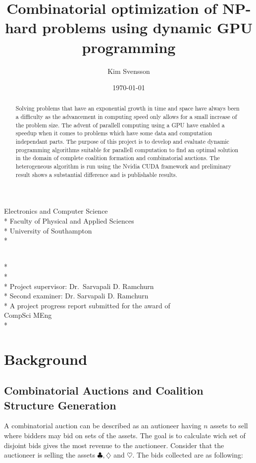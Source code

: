 \documentclass[a4paper, 12pt]{report}
\newcommand{\tdegree}{A project progress report submitted for the award of\\}
\newcommand{\degree}{\tdegree CompSci MEng\\*}
\newcommand{\texam}{Second examiner: }
\newcommand{\exam}{\texam Dr. Sarvapali D. Ramchurn}
\newcommand{\tsupervisor}{Project supervisor: }
\newcommand{\supervisor}{\tsupervisor Dr.\ Sarvapali D. Ramchurn}
\newcommand{\school}{Electronics and Computer Science \\*
Faculty of Physical and Applied Sciences\\*
University of Southampton\\*}
\newenvironment{changemargin}[2]{%
\begin{list}{}{%
\setlength{\topsep}{0pt}%
\setlength{\leftmargin}{#1}%
\setlength{\rightmargin}{#2}%
\setlength{\listparindent}{\parindent}%
\setlength{\itemindent}{\parindent}%
\setlength{\parsep}{\parskip}%
}%
\item[]}{\end{list}}
\begin{document}
\author{Kim Svensson}
\date{\today}
\title{Combinatorial optimization of NP-hard problems using dynamic GPU programming}

\makeatletter
\begin{titlepage}
\begin{changemargin}{-2cm}{-2cm}
\begin{center}
\LARGE\school %

\LARGE
\vfill
\@author \\*
\@date \\*
\doublespacing
\@title \\*
\vfill
\singlespacing
\supervisor \\*
\exam \\*
\vfill
\degree
\end{center} 
\end{changemargin}
\end{titlepage}
\makeatother

\begin{abstract}
Solving problems that have an exponential growth in time and space have always been a difficulty as the advancement in computing speed only allows for a small increase of the problem size. The advent of parallell computing using a GPU have enabled a speedup when it comes to problems which have some data and computation independant parts.
The purpose of this project is to develop and evaluate dynamic programming algorithms suitable for parallell computation to find an optimal solution in the domain of complete coalition formation and combinatorial auctions. The heterogeneous algorithm is run using the Nvidia CUDA framework and preliminary result shows a substantial difference and is publishable results.

\end{abstract}
\tableofcontents
\newpage
\section{Background}
\subsection{Combinatorial Auctions and Coalition Structure Generation}
A combinatorial auction can be described as an autioneer having $n$ assets to sell where bidders may bid on sets of the assets. The goal is to calculate wich set of disjoint bids gives the most revenue to the auctioneer. Consider that the auctioneer is selling the assets $\clubsuit , \diamondsuit$ and $\heartsuit$. The bids collected are as following:
\end{document}
